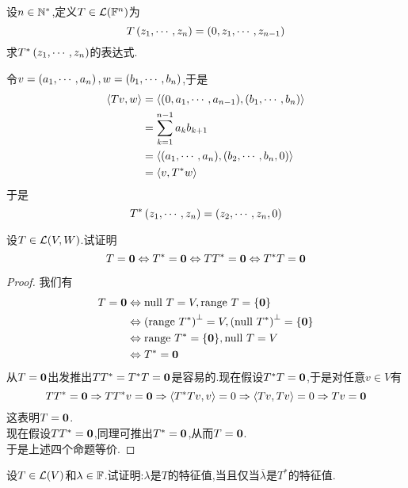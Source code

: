 \documentclass{ctexart}
\begin{document}
\pagestyle{empty}
\begin{center}
    \large{}
\end{center}
\begin{problem}[1.]
    设$n\in\mathbb{N}^*$,定义$T\in\mathcal{L}(\mathbb{F}^n)$为
    \[T\left({z}_1,\cdots,{z}_{n}\right)=\left(0,{z}_1,\cdots,{z}_{n-1}\right)\]
    求$T^*\left({z}_1,\cdots,{z}_{n}\right)$的表达式.
\end{problem}
\begin{solution}
    令$v=\left({a}_1,\cdots,{a}_{n}\right),w=\left({b}_1,\cdots,{b}_{n}\right)$,于是
    \[\begin{aligned}
        \left\langle{Tv},{w}\right\rangle
        &= \left\langle{\left(0,{a}_1,\cdots,{a}_{n-1}\right)},{\left({b}_1,\cdots,{b}_{n}\right)}\right\rangle \\
        &= \sum_{k=1}^{n-1}a_kb_{k+1} \\
        &= \left\langle{\left({a}_1,\cdots,{a}_{n}\right)},{\left(b_2,\cdots,b_n,0\right)}\right\rangle \\
        &= \left\langle{v},{T^*w}\right\rangle
    \end{aligned}\]
    于是
    \[T^*\left({z}_1,\cdots,{z}_{n}\right)=\left(z_2,\cdots,z_n,0\right)\]
\end{solution}
\begin{problem}[2.]
    设$T\in\mathcal{L}(V,W)$.试证明
    \[T=\mathbf0\Leftrightarrow T^*=\mathbf0\Leftrightarrow TT^*=\mathbf0\Leftrightarrow T^*T=\mathbf0\]
\end{problem}
\begin{proof}
    我们有
    \[\begin{aligned}
        T=\mathbf0
        &\Leftrightarrow \text{null } T=V,\text{range } T=\{\mathbf0\} \\
        &\Leftrightarrow \left(\text{range } T^*\right)^\bot=V,\left(\text{null } T^*\right)^\bot=\{\mathbf0\} \\
        &\Leftrightarrow \text{range } T^*=\{\mathbf0\},\text{null } T=V \\
        &\Leftrightarrow T^*=\mathbf0
    \end{aligned}\]
    从$T=\mathbf0$出发推出$TT^*=T^*T=\mathbf0$是容易的.现在假设$T^*T=\mathbf0$,于是对任意$v\in V$有
    \[TT^*=\mathbf0\Rightarrow TT^*v=\mathbf0\Rightarrow\left\langle{T^*Tv},{v}\right\rangle=0\Rightarrow\left\langle{Tv},{Tv}\right\rangle=0\Rightarrow Tv=\mathbf0\]
    这表明$T=\mathbf0$.\\
    现在假设$TT^*=\mathbf0$,同理可推出$T^*=\mathbf0$,从而$T=\mathbf0$.\\
    于是上述四个命题等价.
\end{proof}
\begin{problem}[3.]
    设$T\in\mathcal{L}(V)$和$\lambda\in\mathbb{F}$.试证明:$\lambda$是$T$的特征值,当且仅当$\overline{\lambda}$是$T^*$的特征值.
\end{problem}
\end{document}
